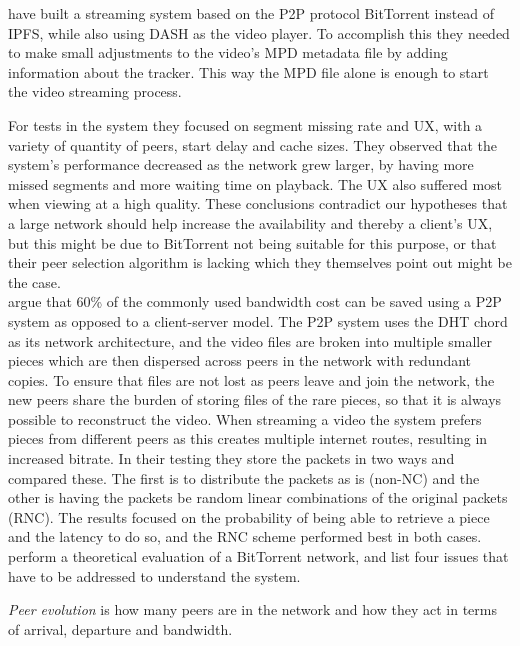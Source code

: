 \citet{gazdar2017toward} have built a streaming system based on the \ac{P2P} protocol BitTorrent instead of \ac{IPFS}, while also using \ac{DASH} as the video player. To accomplish this they needed to make small adjustments to the video's \ac{MPD} metadata file by adding information about the tracker. This way the \ac{MPD} file alone is enough to start the video streaming process.

For tests in the system they focused on segment missing rate and \ac{UX}, with a variety of quantity of peers, start delay and cache sizes. They observed that the system's performance decreased as the network grew larger, by having more missed segments and more waiting time on playback. The \ac{UX} also suffered most when viewing at a high quality. These conclusions contradict our hypotheses that a large network should help increase the availability and thereby a client's \ac{UX}, but this might be due to BitTorrent not being suitable for this purpose, or that their peer selection algorithm is lacking which they themselves point out might be the case.
\\


\citet{nguyen2009p2p} argue that 60\% of the commonly used bandwidth cost can be saved using a \ac{P2P} system as opposed to a client-server model. The \ac{P2P} system uses the \ac{DHT} chord as its network architecture, and the video files are broken into multiple smaller pieces which are then dispersed across peers in the network with redundant copies. To ensure that files are not lost as peers leave and join the network, the new peers share the burden of storing files of the rare pieces, so that it is always possible to reconstruct the video. When streaming a video the system prefers pieces from different peers as this creates multiple internet routes, resulting in increased bitrate. In their testing they store the packets in two ways and compared these. The first is to distribute the packets as is (non-\ac{NC}) and the other is having the packets be random linear combinations of the original packets (\ac{RNC}). The results focused on the probability of being able to retrieve a piece and the latency to do so, and the \ac{RNC} scheme performed best in both cases.
\\


\citet{qiu2004modeling} perform a theoretical evaluation of a BitTorrent network, and list four issues that have to be addressed to understand the system.

\emph{Peer evolution} is how many peers are in the network and how they act in terms of arrival, departure and bandwidth.

